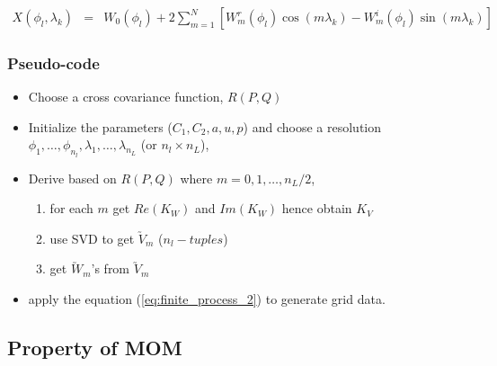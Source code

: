 	\begin{eqnarray} \label{eq:finite_process_2}
		X(\phi_l,\lambda_k) &=& W_0(\phi_l) + 2 \sum_{m =1}^N \left[W_m^r(\phi_l)\cos(m\lambda_k) - W_m^i(\phi_l)\sin(m \lambda_k)\right]
	\end{eqnarray}
	
	\subsubsection{Pseudo-code}
	
	\begin{itemize}
		\item Choose a cross covariance function, $R(P,Q)$
		\item Initialize the parameters ($C_1, C_2, a, u, p$) and choose a resolution $\phi_1,\ldots,\phi_{n_l}, \lambda_1, \ldots, \lambda_{n_L}$ (or $n_l\times n_L$),
		\item Derive \Cm based on $R(P,Q)$ where $m=0,1,\ldots,n_L/2$,
		      \begin{enumerate}
		      	\item for each $m$ get $Re(K_W)$ and $Im(K_W)$ hence obtain $K_V$
		      	\item use SVD to get $\utilde{V}_m$ ($n_l-tuples$)
		      	\item get $\utilde{W}_m$'s from $\utilde{V}_m$
		      \end{enumerate}
		      
		\item apply the equation (\ref{eq:finite_process_2}) to generate grid data.
	\end{itemize}
	
	
	\subsection{Property of MOM}
	
	
	
